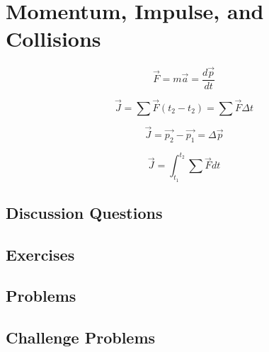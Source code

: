 
\chapter{Momentum, Impulse, and Collisions}

$$\vec{F} = m\vec{a} = \frac{d\vec{p}}{dt}$$

$$\vec{J} = \sum{} \vec{F}(t_2 - t_2) = \sum \vec{F}\Delta{t}$$

$$\vec{J} = \vec{p_2} - \vec{p_1} = \Delta\vec{p}$$

$$\vec{J} = \int^{t_{2}}_{t_{1}} \sum \vec{F}dt$$


\section{Discussion Questions}

\section{Exercises}

\section{Problems}

\section{Challenge Problems}
